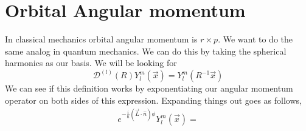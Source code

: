 \section{Orbital Angular momentum}
In classical mechanics orbital angular momentum is $r \times p$. We want to do the same
analog in quantum mechanics. We can do this by taking the spherical harmonics as our basis.
We will be looking for
$$
    \mathcal{D}^{(l)} (R) Y_l^m(\vec{x}) = Y_l^m \left(R^{-1} \vec{x}\right)
$$
We can see if this definition works by exponentiating our angular momentum operator
on both sides of this expression. Expanding things out goes as follows,
\begin{align*}
    e^{-\frac{i}{\hbar} \left(\vec{L}\cdot \hat{n}\right)\phi} Y_l^m (\vec{x}) =
\end{align*}
